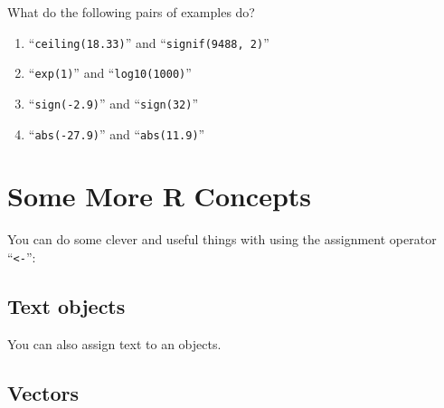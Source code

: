 \documentclass[letterpaperpaper,9pt,twocolumn,twoside,printwatermark=false]{pinp}
\providecommand{\tightlist}{%
  \setlength{\itemsep}{0pt}\setlength{\parskip}{0pt}}
\begin{document}
What do the following pairs of examples do?

\begin{enumerate}
\def\labelenumi{\arabic{enumi}.}
\tightlist
\item
  ``\texttt{ceiling(18.33)}'' and ``\texttt{signif(9488,\ 2)}''
\item
  ``\texttt{exp(1)}'' and ``\texttt{log10(1000)}''
\item
  ``\texttt{sign(-2.9)}'' and ``\texttt{sign(32)}''
\item
  ``\texttt{abs(-27.9)}'' and ``\texttt{abs(11.9)}''
\end{enumerate}

\hypertarget{some-more-r-concepts}{%
\section{Some More R Concepts}\label{some-more-r-concepts}}

You can do some clever and useful things with using the assignment
operator ``\texttt{\textless{}-}'':

\begin{Shaded}
\begin{Highlighting}[]
\StringTok{ }
\StringTok{ }
\StringTok{ }\OperatorTok{*}\StringTok{ }
\end{Highlighting}
\end{Shaded}

\hypertarget{text-objects}{%
\subsection{Text objects}\label{text-objects}}

You can also assign text to an objects.

\begin{Shaded}
\begin{Highlighting}[]
\end{Highlighting}
\end{Shaded}

\hypertarget{vectors}{%
\subsection{Vectors}\label{vectors}}
\end{document}
